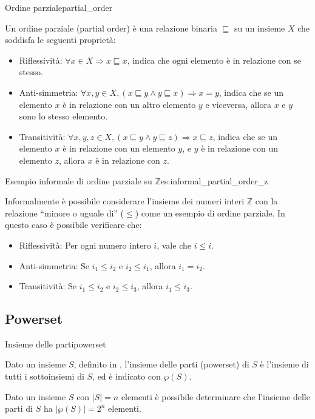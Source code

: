 \begin{definizione}{Ordine parziale}{partial_order}

Un ordine parziale (partial order) è una relazione binaria $\sqsubseteq$ su un
insieme $X$ che soddisfa le seguenti proprietà:

\begin{itemize}
    \item Riflessività: $\forall x \in X \Rightarrow x \sqsubseteq x$, indica che ogni elemento è
    in relazione con se stesso.
    \item Anti-simmetria: $\forall x, y \in X, (x \sqsubseteq y \wedge y \sqsubseteq x)
    \Rightarrow x = y$, indica che se un elemento $x$ è in relazione con un altro
    elemento $y$ e viceversa, allora $x$ e $y$ sono lo stesso elemento.
    \item Transitività: $\forall x, y, z \in X, (x \sqsubseteq y \wedge y \sqsubseteq z)
    \Rightarrow x \sqsubseteq z$, indica che se un elemento $x$ è in relazione con un
    elemento $y$, e $y$ è in relazione con un elemento $z$, allora $x$ è in relazione
    con $z$.
\end{itemize}

\end{definizione}

\begin{esempio}{Esempio informale di ordine parziale su $\mathbb{Z}$}{es:informal_partial_order_z}

Informalmente è possibile considerare l'insieme dei numeri interi
$\mathbb{Z}$ con la relazione ``minore o uguale di'' ($\leq$) come un esempio di
ordine parziale. In questo caso è possibile verificare che:

\begin{itemize}
    \item Riflessività: Per ogni numero intero $i$, vale che $i \leq i$.
    \item Anti-simmetria: Se $i_1 \leq i_2$ e $i_2 \leq i_1$, allora $i_1 = i_2$.
    \item Transitività: Se $i_1 \leq i_2$ e $i_2 \leq i_3$, allora $i_1 \leq i_3$.
\end{itemize}

\end{esempio}

\subsection{Powerset}

\begin{definizione}{Insieme delle parti}{powerset}

Dato un insieme $S$, definito in , l'insieme delle parti
(powerset) di $S$ è l'insieme di tutti i sottoinsiemi di $S$, ed è indicato
con $\wp(S)$.

Dato un insieme $S$ con $|S| = n$ elementi è possibile determinare che l'insieme
delle parti di $S$ ha $|\wp(S)| = 2^n$ elementi.

\end{definizione}

